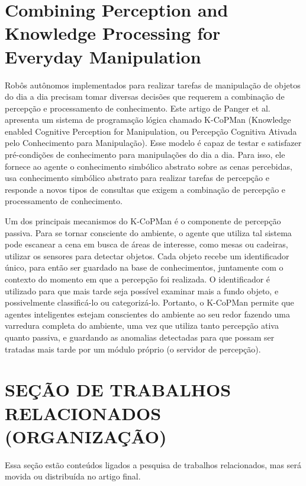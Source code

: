 \section{Combining Perception and Knowledge Processing for Everyday Manipulation \cite{pangercic2010}}

Robôs autônomos implementados para realizar tarefas de manipulação de objetos do dia a dia precisam tomar diversas decisões que requerem a combinação de percepção e processamento de conhecimento. Este artigo de Panger et al. apresenta um sistema de programação lógica chamado K-CoPMan (Knowledge enabled Cognitive Perception for Manipulation, ou Percepção Cognitiva Ativada pelo Conhecimento para Manipulação). Esse modelo é capaz de testar e satisfazer pré-condições de conhecimento para manipulações do dia a dia. Para isso, ele fornece ao agente o conhecimento simbólico abstrato sobre as cenas percebidas, usa conhecimento simbólico abstrato para realizar tarefas de percepção e responde a novos tipos de consultas que exigem a combinação de percepção e processamento de conhecimento.

Um dos principais mecanismos do K-CoPMan é o componente de percepção passiva. Para se tornar consciente do ambiente, o agente que utiliza tal sistema pode escanear a cena em busca de áreas de interesse, como mesas ou cadeiras, utilizar os sensores para detectar objetos. Cada objeto recebe um identificador único, para então ser guardado na base de conhecimentos, juntamente com o contexto do momento em que a percepção foi realizada. O identificador é utilizado para que mais tarde seja possível examinar mais a fundo objeto, e possivelmente classificá-lo ou categorizá-lo. Portanto, o K-CoPMan permite que agentes inteligentes estejam conscientes do ambiente ao seu redor fazendo uma varredura completa do ambiente, uma vez que utiliza tanto percepção ativa quanto passiva, e guardando as anomalias detectadas para que possam ser tratadas mais tarde por um módulo próprio (o servidor de percepção).



\iffalse
\newpage
\section{SEÇÃO DE TRABALHOS RELACIONADOS (ORGANIZAÇÃO)}

Essa seção estão conteúdos ligados a pesquisa de trabalhos relacionados, mas será movida ou distribuída no artigo final.

